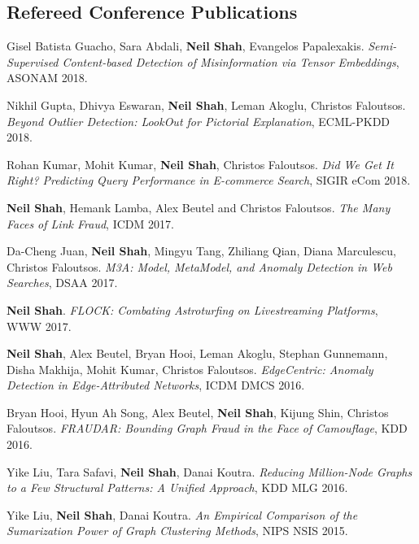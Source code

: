 \documentclass{article}
\begin{document}
\subsection*{\bf {Refereed Conference Publications}}
\begin{etaremune}[itemsep=1pt,parsep=0pt]

\item Gisel Batista Guacho, Sara Abdali, {\bf Neil Shah}, Evangelos Papalexakis.  \emph{Semi-Supervised Content-based Detection of Misinformation via Tensor Embeddings}, ASONAM 2018.  

\item Nikhil Gupta, Dhivya Eswaran, {\bf Neil Shah}, Leman Akoglu, Christos Faloutsos. \emph{Beyond Outlier Detection: LookOut for Pictorial Explanation}, ECML-PKDD 2018.

\item Rohan Kumar, Mohit Kumar, {\bf Neil Shah}, Christos Faloutsos. \emph{Did We Get It Right? Predicting Query Performance in E-commerce Search}, SIGIR eCom 2018.

\item {\bf Neil Shah}, Hemank Lamba, Alex Beutel and Christos Faloutsos. \emph{The Many Faces of Link Fraud}, ICDM 2017.

\item Da-Cheng Juan, {\bf Neil Shah}, Mingyu Tang, Zhiliang Qian, Diana Marculescu, Christos Faloutsos. \emph{M3A: Model, MetaModel, and Anomaly Detection in Web Searches}, DSAA 2017.

\item {\bf Neil Shah}. \emph{FLOCK: Combating Astroturfing on Livestreaming Platforms}, WWW 2017.

\item {\bf Neil Shah}, Alex Beutel, Bryan Hooi, Leman Akoglu, Stephan Gunnemann, Disha Makhija, Mohit Kumar, Christos Faloutsos. \emph{EdgeCentric: Anomaly Detection in Edge-Attributed Networks}, ICDM DMCS 2016.

\item Bryan Hooi, Hyun Ah Song, Alex Beutel, {\bf Neil Shah}, Kijung Shin, Christos Faloutsos. \emph{FRAUDAR: Bounding Graph Fraud in the Face of Camouflage}, KDD 2016.

\item Yike Liu, Tara Safavi, {\bf Neil Shah}, Danai Koutra. \emph{Reducing Million-Node Graphs to a Few Structural Patterns: A Unified Approach}, KDD MLG 2016.

\item Yike Liu, {\bf Neil Shah}, Danai Koutra. \emph{An Empirical Comparison of the Sumarization Power of Graph Clustering Methods}, NIPS NSIS 2015.


\end{etaremune}
\end{document}
